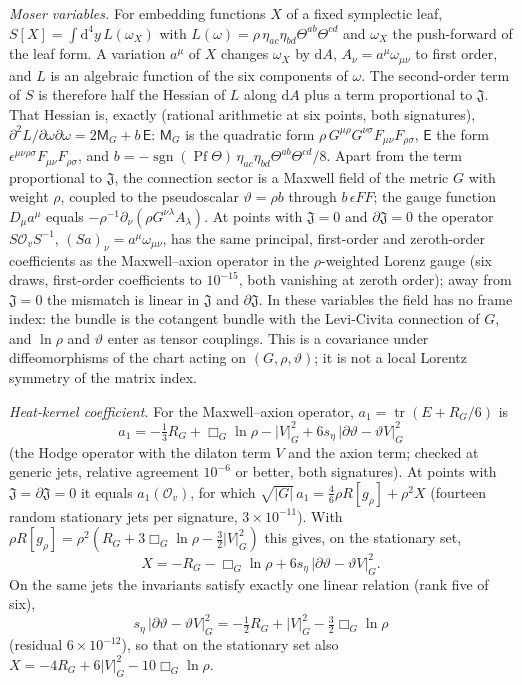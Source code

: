 \emph{Moser variables.} For embedding functions \(X\) of a fixed symplectic leaf, \(S[X]=\int\mathrm d^4y\,L(\omega_X)\) with \(L(\omega)=\rho\,\eta_{ac}\eta_{bd}\Theta^{ab}\Theta^{cd}\) and \(\omega_X\) the push-forward of the leaf form. A variation \(a^\mu\) of \(X\) changes \(\omega_X\) by \(\mathrm dA\), \(A_\nu=a^\mu\omega_{\mu\nu}\) to first order, and \(L\) is an algebraic function of the six components of \(\omega\). The second-order term of \(S\) is therefore half the Hessian of \(L\) along \(\mathrm dA\) plus a term proportional to \(\mathfrak J\). That Hessian is, exactly (rational arithmetic at six points, both signatures), \(\partial^2L/\partial\omega\partial\omega=2\mathsf M_G+b\,\mathsf E\): \(\mathsf M_G\) is the quadratic form \(\rho\,G^{\mu\rho}G^{\nu\sigma}F_{\mu\nu}F_{\rho\sigma}\), \(\mathsf E\) the form \(\epsilon^{\mu\nu\rho\sigma}F_{\mu\nu}F_{\rho\sigma}\), and \(b=-\operatorname{sgn}(\operatorname{Pf}\Theta)\,\eta_{ac}\eta_{bd}\Theta^{ab}\Theta^{cd}/8\). Apart from the term proportional to \(\mathfrak J\), the connection sector is a Maxwell field of the metric \(G\) with weight \(\rho\), coupled to the pseudoscalar \(\vartheta=\rho b\) through \(b\,\epsilon FF\); the gauge function \(D_\mu a^\mu\) equals \(-\rho^{-1}\partial_\nu(\rho G^{\nu\lambda}A_\lambda)\). At points with \(\mathfrak J=0\) and \(\partial\mathfrak J=0\) the operator \(S\mathcal O_vS^{-1}\), \((Sa)_\nu=a^\mu\omega_{\mu\nu}\), has the same principal, first-order and zeroth-order coefficients as the Maxwell--axion operator in the \(\rho\)-weighted Lorenz gauge (six draws, first-order coefficients to \(10^{-15}\), both vanishing at zeroth order); away from \(\mathfrak J=0\) the mismatch is linear in \(\mathfrak J\) and \(\partial\mathfrak J\). In these variables the field has no frame index: the bundle is the cotangent bundle with the Levi-Civita connection of \(G\), and \(\ln\rho\) and \(\vartheta\) enter as tensor couplings. This is a covariance under diffeomorphisms of the chart acting on \((G,\rho,\vartheta)\); it is not a local Lorentz symmetry of the matrix index.

\emph{Heat-kernel coefficient.} For the Maxwell--axion operator, \(a_1=\operatorname{tr}(E+R_G/6)\) is
\[
  a_1=-\tfrac13R_G+\Box_G\ln\rho-\lvert V\rvert_G^2+6s_\eta\,\lvert\partial\vartheta-\vartheta V\rvert_G^2
\]
(the Hodge operator with the dilaton term \(V\) and the axion term; checked at generic jets, relative agreement \(10^{-6}\) or better, both signatures). At points with \(\mathfrak J=\partial\mathfrak J=0\) it equals \(a_1(\mathcal O_v)\), for which \(\sqrt{\lvert G\rvert}\,a_1=\tfrac46\rho R[g_\rho]+\rho^2X\) (fourteen random stationary jets per signature, \(3\times10^{-11}\)). With \(\rho R[g_\rho]=\rho^2(R_G+3\Box_G\ln\rho-\tfrac32\lvert V\rvert_G^2)\) this gives, on the stationary set,
\[
  X=-R_G-\Box_G\ln\rho+6s_\eta\,\lvert\partial\vartheta-\vartheta V\rvert_G^2 .
\]
On the same jets the invariants satisfy exactly one linear relation (rank five of six),
\[
  s_\eta\,\lvert\partial\vartheta-\vartheta V\rvert_G^2=-\tfrac12R_G+\lvert V\rvert_G^2-\tfrac32\Box_G\ln\rho
\]
(residual \(6\times10^{-12}\)), so that on the stationary set also \(X=-4R_G+6\lvert V\rvert_G^2-10\Box_G\ln\rho\).

